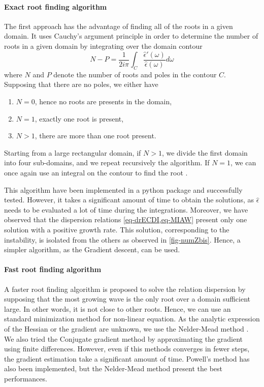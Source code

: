   \paragraph{Exact root finding algorithm\\}
    The first approach has the advantage of finding all of the roots in a given domain.
    It uses Cauchy's argument principle in order to determine the number of roots in a given domain by integrating over the domain contour
    \begin{equation} \label{eq-rootnumber}
      N - P = \frac{1}{2 i \pi} \int_{C} \frac{\hat\epsilon'(\omega)}{\hat\epsilon(\omega)} d\omega
    \end{equation}
    where $N$ and $P$ denote the number of roots and poles in the contour $C$.
    Supposing that there are no poles, we either have
    \begin{enumerate}
      \item $N=0$, hence no roots are presents in the domain,
      \item $N=1$, exactly one root is present,
      \item $N>1$, there are more than one root present.
    \end{enumerate}

    Starting from a large rectangular domain, if $N>1$, we divide the first domain into four sub-domains, and we repeat recursively the algorithm.
    If $N=1$, we can once again use an integral on the contour to find the root \citep{fortune2001}.
    
    \vspace{1em}
    This algorithm have been implemented in a python package and successfully tested.
    However, it takes a significant amount of time to obtain the solutions, as $\hat\epsilon$ needs to be evaluated a lot of time during the integrations.
    Moreover, we have observed that the dispersion relations \cref{eq-drECDI,eq-MIAW} present only one solution with a positive growth rate.
    This solution, corresponding to the instability, is isolated from the others as observed in \cref{fig-numZbis}.
    Hence, a simpler algorithm, as the Gradient descent, can be used.
    
  \paragraph{Fast root finding algorithm\\}
    A faster root finding algorithm is proposed to solve the relation dispersion by supposing that the most growing wave is the only root over a domain sufficient large.
    In other words, it is not close to other roots.
    Hence, we can use an standard minimization method for non-linear equation.
    As the analytic expression of the Hessian or the gradient are unknown, we use the Nelder-Mead method \citep{mckinnon1998}.
    We also tried the Conjugate gradient method by approximating the gradient using finite differences. 
    However, even if this methods converges in fewer steps, the gradient estimation take a significant amount of time.
    Powell's method \citep{powell1964} has also been implemented, but the Nelder-Mead method present the best performances.
    
